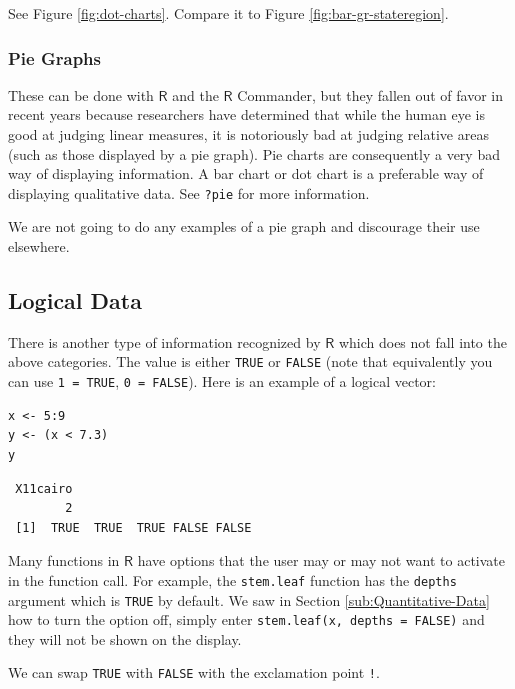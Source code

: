\documentclass[captions=tableheading]{scrbook}
\begin{document}
\begin{example}
See Figure \ref{fig:dot-charts}. Compare it to Figure \ref{fig:bar-gr-stateregion}.

\end{example}
\subsubsection{Pie Graphs}
\label{sec-2-1-4-5}
\label{par:Pie-Graphs}


These can be done with \(\mathsf{R}\) and the \(\mathsf{R}\) Commander, but they fallen out of favor in recent years because researchers have determined that while the human eye is good at judging linear measures, it is notoriously bad at judging relative areas (such as those displayed by a pie graph). Pie charts are consequently a very bad way of displaying information. A bar chart or dot chart is a preferable way of displaying qualitative data. See \texttt{?pie} for more information.

We are not going to do any examples of a pie graph and discourage their use elsewhere. 
\subsection{Logical Data}
\label{sec-2-1-5}
\label{sub:Logical-Data}


There is another type of information recognized by \(\mathsf{R}\) which does not fall into the above categories. The value is either \texttt{TRUE} or \texttt{FALSE} (note that equivalently you can use \texttt{1 = TRUE}, \texttt{0 = FALSE}). Here is an example of a logical vector:


\begin{verbatim}
x <- 5:9
y <- (x < 7.3)
y
\end{verbatim}

\begin{verbatim}
 X11cairo 
        2
 [1]  TRUE  TRUE  TRUE FALSE FALSE
\end{verbatim}

Many functions in \(\mathsf{R}\) have options that the user may or may not want to activate in the function call. For example, the \texttt{stem.leaf} function has the \texttt{depths} argument which is \texttt{TRUE} by default. We saw in Section \ref{sub:Quantitative-Data} how to turn the option off, simply enter \texttt{stem.leaf(x, depths = FALSE)} and they will not be shown on the display.

We can swap \texttt{TRUE} with \texttt{FALSE} with the exclamation point \texttt{!}.
\end{document}

